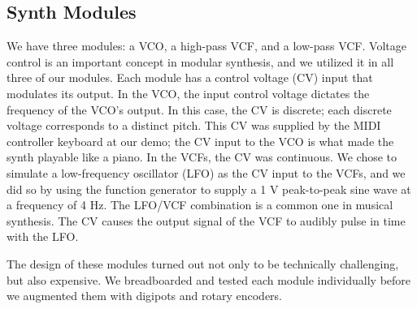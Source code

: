 \documentclass[letterpaper, 12 pt, conference]{ieeeconf}
\begin{document}
\subsection{Synth Modules}

We have three modules: a VCO, a high-pass VCF, and a low-pass VCF. Voltage control is an important concept in modular synthesis, and we utilized it in all three of our modules. Each module has a control voltage (CV) input that modulates its output. In the VCO, the input control voltage dictates the frequency of the VCO's output. In this case, the CV is discrete; each discrete voltage corresponds to a distinct pitch. This CV was supplied by the MIDI controller keyboard at our demo; the CV input to the VCO is what made the synth playable like a piano. In the VCFs, the CV was continuous. We chose to simulate a low-frequency oscillator (LFO) as the CV input to the VCFs, and we did so by using the function generator to supply a 1 V peak-to-peak sine wave at a frequency of 4 Hz. The LFO/VCF combination is a common one in musical synthesis. The CV causes the output signal of the VCF to audibly pulse in time with the LFO. 

The design of these modules turned out not only to be technically challenging, but also expensive. We breadboarded and tested each module individually before we augmented them with digipots and rotary encoders. 
\end{document}

